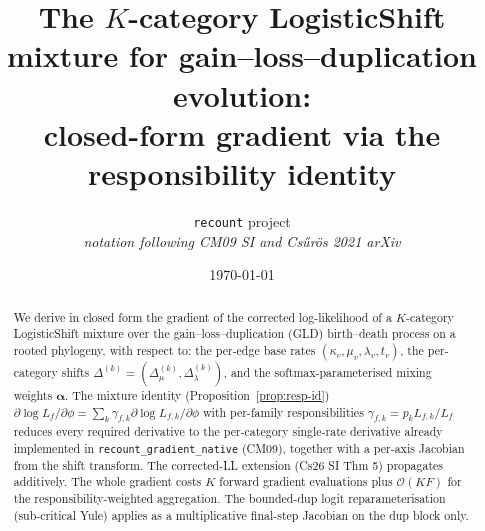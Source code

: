 \documentclass[11pt]{article}
\title{The $K$-category LogisticShift mixture for gain--loss--duplication evolution:\\
       closed-form gradient via the responsibility identity}
\author{\texttt{recount} project\\
        \textit{notation following CM09 SI and Cs\H{u}r\"os 2021 arXiv}}
\date{\today}
\newcommand{\rate}{\kappa}
\newcommand{\dup}{\lambda}
\newcommand{\loss}{\mu}
\newcommand{\edgelen}{t}
\theoremstyle{definition}
\begin{document}
\maketitle

\begin{center}
\end{center}

\begin{abstract}
We derive in closed form the gradient of the corrected log-likelihood
of a $K$-category LogisticShift mixture over the
gain--loss--duplication (GLD) birth--death process on a rooted
phylogeny, with respect to: the per-edge base rates
$(\rate_v,\loss_v,\dup_v,\edgelen_v)$, the per-category shifts
$\Delta^{(k)} = (\Delta_\loss^{(k)}, \Delta_\dup^{(k)})$, and the
softmax-parameterised mixing weights $\bm\alpha$. The mixture
identity (Proposition~\ref{prop:resp-id})
$\partial \log L_f / \partial \phi = \sum_k \gamma_{f,k}
   \partial \log L_{f,k} / \partial \phi$
with per-family responsibilities $\gamma_{f,k} = p_k L_{f,k}/L_f$
reduces every required derivative to the per-category single-rate
derivative already implemented in
\texttt{recount\_gradient\_native} (CM09), together with a per-axis
Jacobian from the shift transform. The corrected-LL extension
(Cs26 SI Thm 5) propagates additively. The whole gradient costs
$K$ forward gradient evaluations plus $\mathcal{O}(KF)$ for the
responsibility-weighted aggregation. The bounded-dup
logit reparameterisation (sub-critical Yule) applies as a
multiplicative final-step Jacobian on the dup block only.
\end{abstract}

\end{document}
